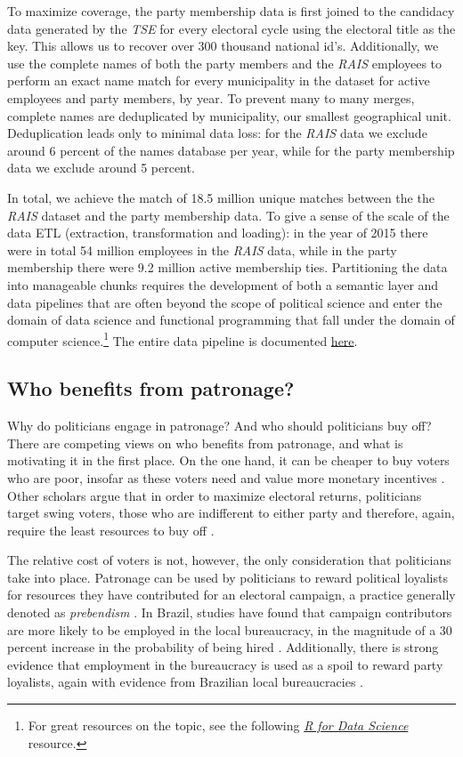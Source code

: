 To maximize coverage, the party membership data is first joined to the candidacy data generated by the \emph{TSE} for every electoral cycle using the electoral title as the key. This allows us to recover over 300 thousand national id's. Additionally, we use the complete names of both the party members and the \emph{RAIS} employees to perform an exact name match for every municipality in the dataset for active employees and party members, by year. To prevent many to many merges, complete names are deduplicated by municipality, our smallest geographical unit. Deduplication leads only to minimal data loss: for the \emph{RAIS} data we exclude around 6 percent of the names database per year, while for the party membership data we exclude around 5 percent.

In total, we achieve the match of 18.5 million unique matches between the the \emph{RAIS} dataset and the party membership data. To give a sense of the scale of the data ETL (extraction, transformation and loading): in the year of 2015 there were in total 54 million employees in the \emph{RAIS} data, while in the party membership there were 9.2 million active membership ties. Partitioning the data into manageable chunks requires the development of both a semantic layer and data pipelines that are often beyond the scope of political science and enter the domain of data science and functional programming that fall under the domain of computer science.\footnote{For great resources on the topic, see the following \href{https://r4ds.had.co.nz/index.html}{\emph{R for Data Science}} resource.} The entire data pipeline is documented \href{https://github.com/galileukim/ego_patronage}{here}.

\subsection{Who benefits from patronage?}

Why do politicians engage in patronage? And who should politicians buy off? There are competing views on who benefits from patronage, and what is motivating it in the first place. On the one hand, it can be cheaper to buy voters who are poor, insofar as these voters need and value more monetary incentives \citet{stokes2013brokers}. Other scholars argue that in order to maximize electoral returns, politicians target swing voters, those who are indifferent to either party and therefore, again, require the least resources to buy off \citep{dixit1996determinants}.

The relative cost of voters is not, however, the only consideration that politicians take into place. Patronage can be used by politicians to reward political loyalists for resources they have contributed for an electoral campaign, a practice generally denoted as \emph{prebendism} \citep{van2007meet}. In Brazil, studies have found that campaign contributors are more likely to be employed in the local bureaucracy, in the magnitude of a 30 percent increase in the probability of being hired \citep{colonnelli2018patronage}. Additionally, there is strong evidence that employment in the bureaucracy is used as a spoil to reward party loyalists, again with evidence from Brazilian local bureaucracies \citep{brollo_victor_2017}.

